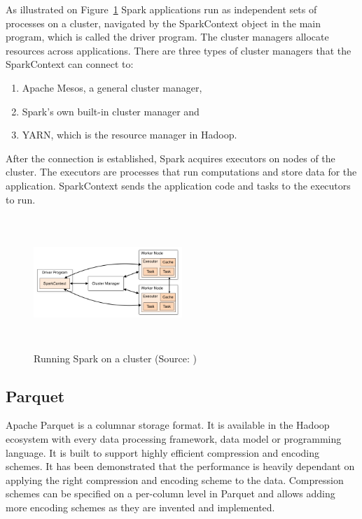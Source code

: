As illustrated on Figure~\ref{fig:spark-cluster} Spark applications run as independent sets of processes on a cluster, navigated by the SparkContext object in the main program, which is called the driver program. The cluster managers allocate resources across applications. There are three types of cluster managers that the SparkContext can connect to:
\begin{enumerate}
\item Apache Mesos, a general cluster manager, 
\item Spark's own built-in cluster manager and
\item YARN, which is the resource manager in Hadoop.
\end{enumerate}
After the connection is established, Spark acquires executors on nodes of the cluster. The executors are processes that run computations and store data for the application. SparkContext sends the application code and tasks to the executors to run.
\cite{spark-cluster}

\begin{figure}[h]
    \centering
    \includegraphics[width=0.5\textwidth, height=5cm]{images/cluster-overview}
    \caption{Running Spark on a cluster (Source: \cite{spark-cluster})}
    \label{fig:spark-cluster}
\end{figure}

\subsection{Parquet}
Apache Parquet is a columnar storage format. It is available in the Hadoop ecosystem with every data processing framework, data model or programming language. It is built to support highly efficient compression and encoding schemes. It has been demonstrated that the performance is heavily dependant on applying the right compression and encoding scheme to the data. Compression schemes can be specified on a per-column level in Parquet and allows adding more encoding schemes as they are invented and implemented.
\cite{parquet}


